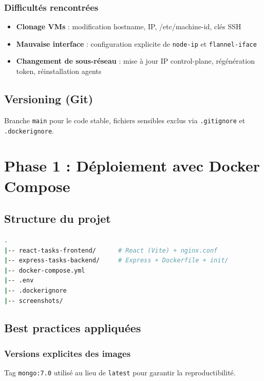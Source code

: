 \documentclass[12pt,a4paper]{report}
\begin{document}
\subsection{Difficultés rencontrées}
\begin{itemize}
\item \textbf{Clonage VMs} : modification hostname, IP, /etc/machine-id, clés SSH
\item \textbf{Mauvaise interface} : configuration explicite de \texttt{node-ip} et \texttt{flannel-iface}
\item \textbf{Changement de sous-réseau} : mise à jour IP control-plane, régénération token, réinstallation agents
\end{itemize}

\section{Versioning (Git)}
Branche \texttt{main} pour le code stable, fichiers sensibles exclus via \texttt{.gitignore} et \texttt{.dockerignore}.

\chapter{Phase 1 : Déploiement avec Docker Compose}

\section{Structure du projet}

\begin{lstlisting}[language=bash]
.
|-- react-tasks-frontend/      # React (Vite) + nginx.conf
|-- express-tasks-backend/     # Express + Dockerfile + init/
|-- docker-compose.yml
|-- .env
|-- .dockerignore
|-- screenshots/
\end{lstlisting}

\section{Best practices appliquées}

\subsection{Versions explicites des images}
Tag \texttt{mongo:7.0} utilisé au lieu de \texttt{latest} pour garantir la reproductibilité.
\end{document}
